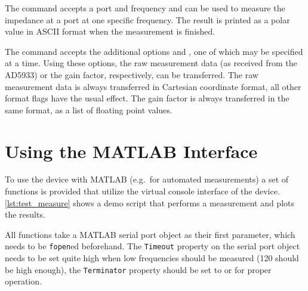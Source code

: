 The  command accepts a port and frequency and can be used to measure the impedance at a port at
one specific frequency. The result is printed as a polar value in ASCII format when the measurement is finished.

The  command accepts the additional options  and , one of which may
be specified at a time. Using these options, the raw measurement data (as received from the AD5933) or the gain factor,
respectively, can be transferred. The raw measurement data is always transferred in Cartesian coordinate format, all
other format flags have the usual effect. The gain factor is always transferred in the same format, as a list of
floating point values.


\section{Using the MATLAB Interface}

To use the device with MATLAB (e.g.\ for automated measurements) a set of functions is provided that utilize the
virtual console interface of the device. \autoref{lst:test_measure} shows a demo script that performs a measurement and
plots the results.

All functions take a MATLAB serial port object as their first parameter, which needs to be \texttt{fopen}ed beforehand.
The \texttt{Timeout} property on the serial port object needs to be set quite high when low frequencies should be
measured (\unit{120}{\second} should be high enough), the \texttt{Terminator} property should be set to
 or  for proper operation.

